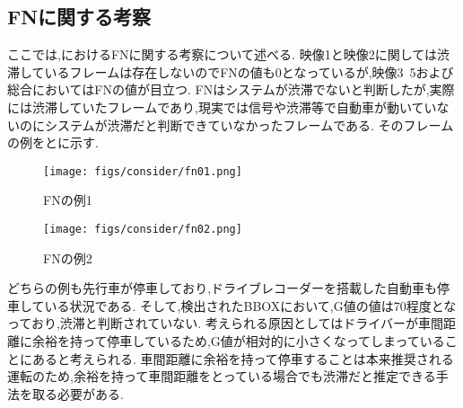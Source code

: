 \newpage
\subsection{FNに関する考察}
ここでは,におけるFNに関する考察について述べる.
映像1と映像2に関しては渋滞しているフレームは存在しないのでFNの値も0となっているが,映像3~5および総合においてはFNの値が目立つ.
FNはシステムが渋滞でないと判断したが,実際には渋滞していたフレームであり,現実では信号や渋滞等で自動車が動いていないのにシステムが渋滞だと判断できていなかったフレームである.
そのフレームの例をとに示す.

\begin{figure}[htbp]
  \begin{minipage}{0.5\hsize}
   \begin{center}
    \texttt{[image: figs/consider/fn01.png]}
   \end{center}
   \caption{FNの例1}
   \label{fig:fn01}
  \end{minipage}
  \begin{minipage}{0.5\hsize}
  \begin{center}
   \texttt{[image: figs/consider/fn02.png]}
  \end{center}
   \caption{FNの例2}
   \label{fig:fn02}
  \end{minipage}
 \end{figure}

どちらの例も先行車が停車しており,ドライブレコーダーを搭載した自動車も停車している状況である.
そして,検出されたBBOXにおいて,G値の値は70程度となっており,渋滞と判断されていない.
考えられる原因としてはドライバーが車間距離に余裕を持って停車しているため,G値が相対的に小さくなってしまっていることにあると考えられる.
車間距離に余裕を持って停車することは本来推奨される運転のため,余裕を持って車間距離をとっている場合でも渋滞だと推定できる手法を取る必要がある.

